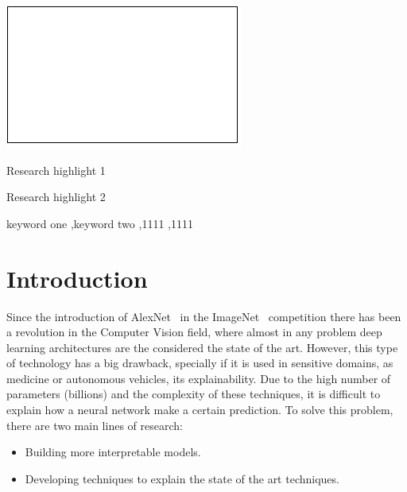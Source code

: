 \documentclass[preprint,12pt]{elsarticle}
\begin{document}
\begin{frontmatter}
\begin{graphicalabstract}
\includegraphics{grabs}
\end{graphicalabstract}

\begin{highlights}
\item Research highlight 1
\item Research highlight 2
\end{highlights}

\begin{keyword}
keyword one \sep keyword two
 \sep 1111
 \sep 1111
\end{keyword}

\end{frontmatter}


\section{Introduction}
\label{sec:introduction}
Since the introduction of AlexNet~\cite{krizhevskyImageNetClassificationDeep2012} in the ImageNet~\cite{ImageNet} competition there has been a revolution in the Computer Vision field, where almost in any problem deep learning architectures are the considered the state of the art. However, this type of technology has a big drawback, specially if it is used in sensitive domains, as medicine or autonomous vehicles, its explainability. Due to the high number of parameters (billions) and the complexity of these techniques, it is difficult to explain how a neural network make a certain prediction. To solve this problem, there are two main lines of research:

\begin{itemize}
    \item Building more interpretable models.
    \item Developing techniques to explain the state of the art techniques.
\end{itemize}
\end{document}
